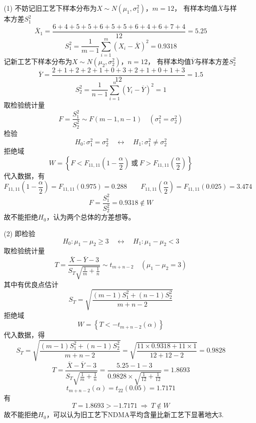 \documentclass{article}
\begin{document}
\section{}  %
\begin{enumerate}
    \item [(1)]不妨记旧工艺下样本分布为$X\sim N(\mu_1, \sigma_1^2)$，$m=12$，
    有样本均值$\overline{X}$与样本方差$S_1^2$
    \[
        \overline{X}_1
        = \frac{6 + 4 + 5 + 5 + 6 + 5 + 5 + 6 + 4 + 6 + 7 + 4}{12}    
        = 5.25
    \]
    \[
        S_1^2
        = \frac{1}{m-1} \sum\limits_{i=1}^{m} {(X_i - \overline{X})}^2
        = 0.9318
    \]
    记新工艺下样本分布为$X\sim N(\mu_2, \sigma_2^2)$，$n = 12$，
    有样本均值$\overline{Y}$与样本方差$S_2^2$
    \[
        \overline{Y}
        = \frac{2 + 1 + 2 + 2 + 1 + 0 + 3 + 2 + 1 + 0 + 1 + 3}{12}
        = 1.5    
    \]
    \[
        S_2^2
        = \frac{1}{n-1} \sum\limits_{i=1}^{n} {(Y_i - \overline{Y})}^2
        = 1
    \]
    取检验统计量
    \[
        F = \frac{S_1^2}{S_2^2}  \sim F(m-1,n-1) \quad (\sigma_1^2 = \sigma_2^2)
    \]
    检验
    \[
        H_0 : \sigma_1^2 = \sigma_2^2 
        \quad \leftrightarrow \quad
        H_1 : \sigma_1^2 \neq \sigma_2^2 
    \]
    拒绝域
    \[
        W = 
        \left\{
            F < F_{11,11} \left(1 - \frac{\alpha}{2}\right)
            \ \mbox{或}\ 
            F > F_{11,11} \left(\frac{\alpha}{2}\right)
        \right\}
    \]
    代入数据，有
    \[
        F_{11,11} \left(1 - \frac{\alpha}{2}\right)
        = F_{11,11} (0.975)
        = 0.288
        \qquad
        F_{11,11} \left(\frac{\alpha}{2}\right)
        = F_{11,11} (0.025)
        = 3.474
    \]
    \[
        F 
        = \frac{S_1^2}{S_2^2}
        = 0.9318 \notin W 
    \]
    故不能拒绝$H_0$，认为两个总体的方差想等。
    \item [(2)]即检验
    \[
        H_0 : \mu_1 - \mu_2 \geq 3
        \quad \leftrightarrow \quad
        H_1 : \mu_1 - \mu_2 <3 
    \]
    取检验统计量
    \[
        T = \frac{\overline{X} - \overline{Y} - 3}
        {S_T \sqrt{\frac{1}{m} + \frac{1}{n}}}    
        \sim t_{m+n-2}
        \quad (\mu_1 - \mu_2 = 3)
    \]
    其中有优良点估计
    \[
        S_T = \sqrt{\frac{(m-1) S_1^2 + (n-1) S_2^2}{m+n-2}}    
    \]
    拒绝域
    \[
        W = 
        \left\{
            T < - t_{m+n-2} (\alpha)
        \right\}    
    \]
    代入数据，得
    \[
        S_T 
        = \sqrt{\frac{(m-1) S_1^2 + (n-1) S_2^2}{m+n-2}}  
        = \sqrt{\frac{11\times 0.9318 + 11\times 1}{12+12-2}}
        = 0.9828   
    \]
    \[
        T
        = \frac{\overline{X} - \overline{Y} - 3}{S_T \sqrt{\frac{1}{m} + \frac{1}{n}}}     
        = \frac{5.25 - 1 - 3}{0.9828 \times \sqrt{\frac{1}{12} + \frac{1}{12}}}
        = 1.8693
    \]
    \[
        t_{m+n-2}(\alpha) 
        = t_{22}(0.05)
        = 1.7171 
    \]
    有
    \[
        T = 1.8693 > -1.7171
        \ \Rightarrow\ 
        T \notin W    
    \]
    故不能拒绝$H_0$，可以认为旧工艺下NDMA平均含量比新工艺下显著地大3.
\end{enumerate}
\end{document}
